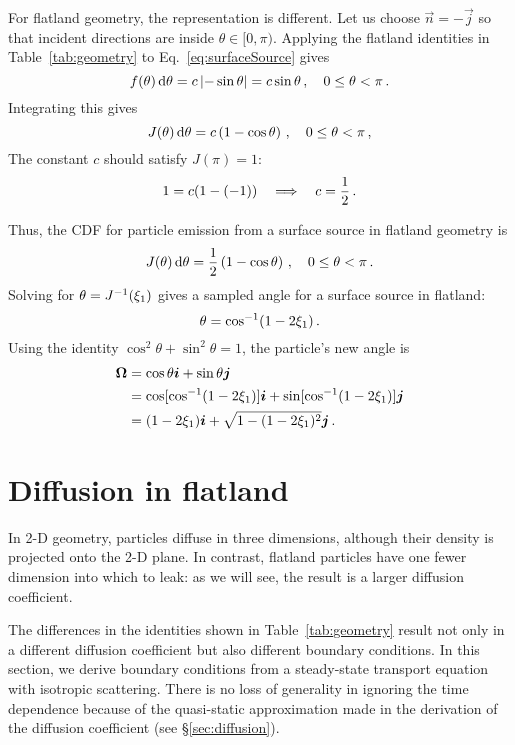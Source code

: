 For flatland geometry, the representation is different. Let us choose
$\vec{n} = -\vec{j}$ so that incident directions are inside
$\theta \in [0, \pi)$.
Applying the flatland identities in Table~\ref{tab:geometry} to
Eq.~\eqref{eq:surfaceSource} gives
\begin{equation*}
  f(\theta) \mathop{}\!\mathrm{d}\theta = c\left|  -\sin \theta \right|
  = c \sin \theta \,,\quad 0 \le \theta < \pi\,.
\end{equation*}
Integrating this gives
\begin{equation*}
  J(\theta) \mathop{}\!\mathrm{d}\theta = c \left( 1-\cos\theta \right)
  \,,\quad 0 \le \theta < \pi\,,
\end{equation*}
The constant $c$ should satisfy $J(\pi)=1$:
\begin{equation*}
  1 = c (1 - (-1) ) \quad \Longrightarrow \quad c=\frac{1}{2}\,.
\end{equation*}

Thus, the CDF for particle emission from a surface source in flatland geometry
is
\begin{equation*}
  J(\theta) \mathop{}\!\mathrm{d}\theta = \frac{1}{2} \left( 1-\cos\theta \right)
  \,,\quad 0 \le \theta < \pi\,.
\end{equation*}
Solving for $\theta = J^{-1}(\xi_1)$ gives a sampled angle for a surface source
in flatland:
\begin{equation*}
  \theta = \cos^{-1}(1 - 2\xi_1)\,.
\end{equation*}
Using the identity $\cos^2 \theta + \sin^2 \theta = 1$, the particle's new angle is
\begin{align*}
  \bm{\Omega} &= \cos \theta \bm{i} + \sin \theta \bm{j} \\
  &=  \cos[ \cos^{-1}(1 - 2\xi_1) ] \bm{i} + \sin[ \cos^{-1}(1 - 2\xi_1) ] \bm{j} \\
  &= (1 - 2\xi_1) \bm{i} + \sqrt{1 - (1 - 2\xi_1)^2} \bm{j}\,.
\end{align*}

\section{Diffusion in flatland}

In 2-D geometry, particles diffuse in three dimensions, although their density
is projected onto the 2-D plane. In contrast, flatland particles have one fewer
dimension into which to leak: as we will see, the result is a larger diffusion
coefficient.

The differences in the identities shown in Table~\ref{tab:geometry} result not
only in a different diffusion coefficient but also different boundary
conditions. In this section, we derive boundary conditions from a steady-state
transport equation with isotropic scattering. There is no loss of generality in
ignoring the time dependence because of the quasi-static approximation made in
the derivation of the diffusion coefficient (see \S\ref{sec:diffusion}).

